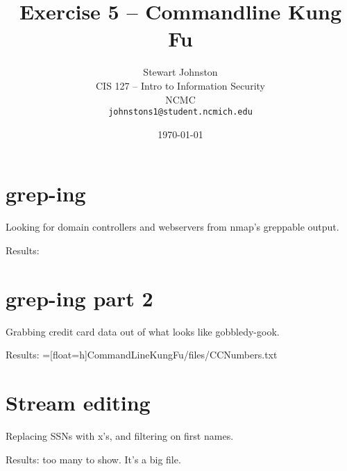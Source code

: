 \documentclass{article}
\title{Exercise 5 -- Commandline Kung Fu}
\author{Stewart Johnston\\
  {CIS 127 -- Intro to Information Security}\\
  {NCMC}\\
  {\texttt{johnstons1@student.ncmich.edu}}
}
\date{\today}
\begin{document}
\lstset{
	basicstyle=\ttfamily,
	language=bash,
	alsolanguage=awk}

\maketitle

\section{grep-ing}
Looking for domain controllers and webservers from nmap's greppable output.



Results: 

\section{grep-ing part 2}
Grabbing credit card data out of what looks like gobbledy-gook.



Results: =[float=h]{CommandLineKungFu/files/CCNumbers.txt}

\section{Stream editing}
Replacing SSNs with x's, and filtering on first names.



Results: too many to show. It's a big file.
\end{document}
